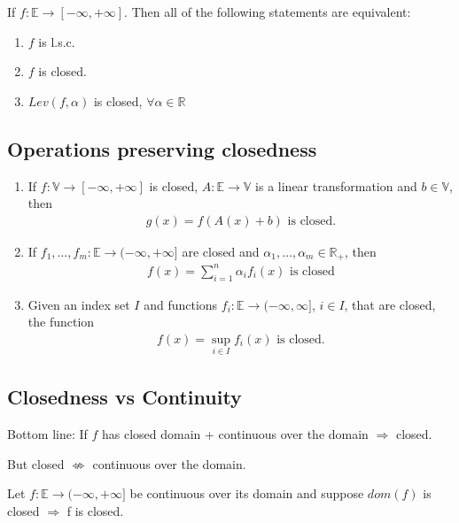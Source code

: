 \documentclass[11pt]{article}
\begin{document}
\begin{theorem}
    If $f:\mathbb{E} \to [-\infty,+\infty]$. Then all of the following statements are equivalent:
    \begin{enumerate}
        \item $f$ is l.s.c.
        \item $f$ is closed.
        \item $Lev(f,\alpha)$ is closed, $\forall \alpha \in \mathbb{R}$
    \end{enumerate}
\end{theorem}

\subsection{Operations preserving closedness}
\begin{enumerate}
    \item If $f: \mathbb{V} \to [-\infty,+\infty]$ is closed, $A:\mathbb{E} \to \mathbb{V}$ is a linear transformation
    and $b \in \mathbb{V}$, then 
    \begin{align*}
        g(x) = f(A(x)+b) \text{ is closed.}
    \end{align*}
    \item If $f_1, \ldots ,f_m: \mathbb{E} \to (-\infty,+\infty]$ are closed and $\alpha_1, \ldots ,\alpha_m \in \mathbb{R}_{+}$,
    then 
    \begin{align*}
        f(x) = \sum_{i=1}^{n}\alpha_{i} f_{i}(x) \text{ is closed}
    \end{align*}
    \item Given an index set $I$ and functions $f_i: \mathbb{E} \to (-\infty,\infty]$, $i \in I$,
    that are closed, the function 
    \begin{align*}
        f(x) = \sup_{i \in I} f_{i}(x) \text{ is closed.}
    \end{align*}
\end{enumerate}

\subsection{Closedness vs Continuity}
Bottom line: If $f$ has closed domain + continuous over the domain $\Longrightarrow$ closed.

But closed $\not\iff$ continuous over the domain.

\begin{theorem}
    Let $f: \mathbb{E} \to (-\infty,+\infty]$ be continuous over its domain and suppose $dom(f)$ is closed
    $\Longrightarrow$ f is closed.
\end{theorem}
\end{document}

